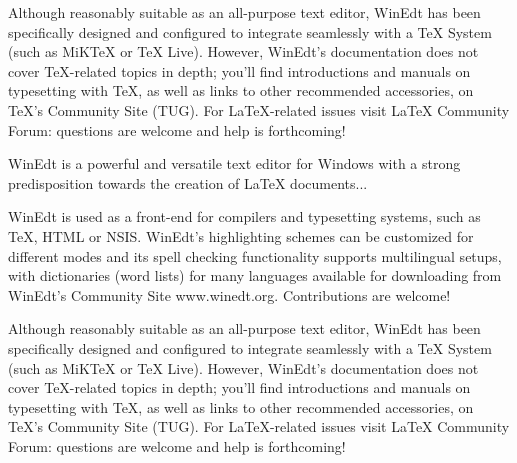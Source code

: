 \documentclass[12pt,a4paper]{article}
\let\footnote=\endnote
\begin{document}
Although reasonably suitable as an all-purpose text editor, WinEdt has been specifically designed and configured to integrate seamlessly with a TeX System (such as MiKTeX or TeX Live). However, WinEdt's documentation does not cover TeX-related topics in depth; you'll find introductions and manuals on typesetting with TeX, as well as links to other recommended accessories, on TeX's Community Site (TUG). For LaTeX-related issues visit LaTeX Community Forum: questions are welcome and help is forthcoming!

WinEdt\footnote{Our Editor Software} is a powerful and versatile text editor for Windows with a strong predisposition towards the creation of LaTeX documents...

WinEdt is used as a front-end for compilers and typesetting systems, such as TeX, HTML or NSIS. WinEdt's highlighting schemes can be customized for different modes and its spell checking functionality supports multilingual setups, with dictionaries (word lists) for many languages available for downloading from WinEdt's Community Site www.winedt.org. Contributions are welcome!

Although reasonably suitable as an all-purpose text editor, WinEdt has been specifically designed and configured to integrate seamlessly with a TeX System (such as MiKTeX or TeX Live). However, WinEdt's documentation does not cover TeX-related topics in depth; you'll find introductions and manuals on typesetting with TeX, as well as links to other recommended accessories, on TeX's Community Site (TUG). For LaTeX-related issues visit LaTeX Community Forum: questions are welcome and help is forthcoming!


\theendnotes
\end{document}

